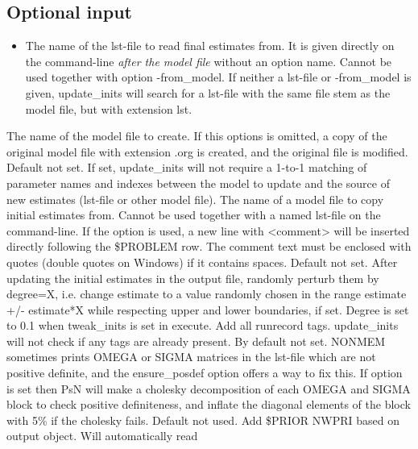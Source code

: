 \subsection{Optional input}
\begin{itemize}
\item The name of the lst-file to read final estimates from. It is given directly on 
the command-line \emph{after the model file} without an option name.
Cannot be used together with option -from\_model. 
If neither a lst-file or -from\_model is given, 
update\_inits will search for a lst-file with the same file stem as the model file, 
but with extension lst.
\end{itemize}
\begin{optionlist}
The name of the model file to create. If this options is omitted, a copy of
the original model file with extension .org is created, and 
the original file is modified.
\nextopt
{}
Default not set. If set, update\_inits will not require 
a 1-to-1 matching of parameter names and indexes between the model to update and the source
of new estimates (lst-file or other model file).
\nextopt
{}
The name of a model file to copy initial estimates from. 
Cannot be used together with a named lst-file on the command-line.
\nextopt
{}
If the option is used, a new line with <comment> will be inserted 
directly following the \$PROBLEM row.
The comment text must be enclosed with quotes (double quotes on Windows) 
if it contains spaces.
\nextopt
{}
Default not set. 
After updating the initial estimates in the output file, randomly
perturb them by degree=X, i.e. change estimate to a value
randomly chosen in the range estimate +/- estimate*X while
respecting upper and lower boundaries, if set.
Degree is set to 0.1 when tweak\_inits is set in execute.
\nextopt
{}
Add all runrecord tags. update\_inits will not check if any tags 
are already present.
\nextopt
{}
By default not set. 
NONMEM sometimes prints OMEGA or SIGMA matrices
in the lst-file which are not positive definite, and the 
ensure\_posdef option offers a way to fix this.
If option is set then PsN will make a cholesky decomposition of
each OMEGA and SIGMA block to check positive definiteness, and
inflate the diagonal elements of the block with 5\% 
if the cholesky fails.
\nextopt
{}
Default not used. Add \$PRIOR NWPRI based on output object. Will automatically read

\end{optionlist}
